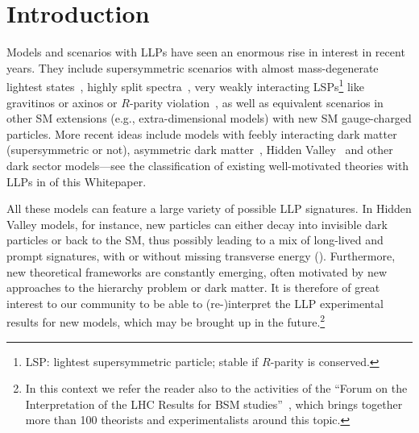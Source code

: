 \section{Introduction}
\label{sec:ch5-introduction}

Models and scenarios with LLPs have seen an enormous rise in interest in recent years.
They include supersymmetric scenarios with almost mass-degenerate lightest states~\cite{Chen:1995yu,Feng:1999fu}, 
highly split spectra~\cite{ArkaniHamed:2004fb,Giudice:2004tc}, 
very weakly interacting LSPs\footnote{LSP: lightest supersymmetric particle; stable if $R$-parity is conserved.} 
like gravitinos or axinos \cite{Pagels:1981ke,Covi:1999ty} or $R$-parity violation~\cite{Barbier:2004ez}, 
as well as equivalent scenarios in other SM extensions (e.g., extra-dimensional models) with new SM gauge-charged particles. 
More recent ideas include models with feebly interacting dark matter \cite{Hall:2009bx} (supersymmetric or not), asymmetric dark matter~\cite{Zurek:2013wia}, Hidden Valley~\cite{Strassler:2006im} and other dark sector models---see the classification of existing well-motivated 
theories with LLPs in  {} of this Whitepaper.

All these models can feature a large variety of possible LLP signatures. In Hidden Valley models, for instance,   
new particles can either decay into invisible dark particles or back to the SM, thus possibly leading to a 
mix of long-lived and prompt signatures, with or without missing transverse energy (\MET). 
Furthermore, new theoretical frameworks are constantly emerging, often motivated by 
new approaches to the hierarchy problem or dark matter. 
It is therefore of great interest to our community to be able to (re-)interpret the LLP experimental results 
for new models, which may be brought up in the future.\footnote{In this context we refer the reader also to 
the activities of the ``Forum on the Interpretation of the LHC Results for BSM studies''~\cite{reinterpretationForum}, which brings together more than 
100 theorists and experimentalists around this topic.}

